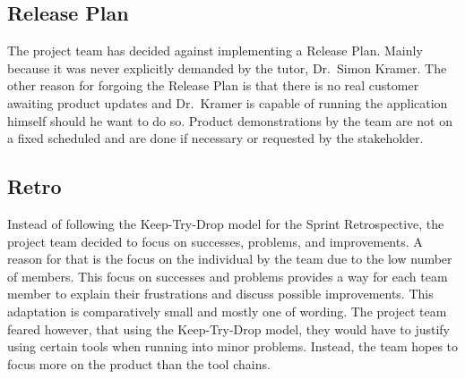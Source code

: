\subsection{Release Plan}\label{subsec:release-plan}
The project team has decided against implementing a Release Plan.
Mainly because it was never explicitly demanded by the tutor, Dr.\ Simon Kramer.
The other reason for forgoing the Release Plan is that
there is no real customer awaiting product updates and Dr.\ Kramer is capable of running the application himself should he want to do so.
Product demonstrations by the team are not on a fixed scheduled and
are done if necessary or requested by the stakeholder.
\subsection{Retro}\label{subsec:retro}
Instead of following the Keep-Try-Drop model for the Sprint Retrospective, the project team decided to focus on successes, problems, and improvements.
A reason for that is the focus on the individual by the team due to the low number of members.
This focus on successes and problems provides a way for each team member to explain their frustrations and discuss possible improvements.
This adaptation is comparatively small and mostly one of wording.
The project team feared however, that using the Keep-Try-Drop model, they would have to justify using certain tools when running into minor problems.
Instead, the team hopes to focus more on the product than the tool chains.